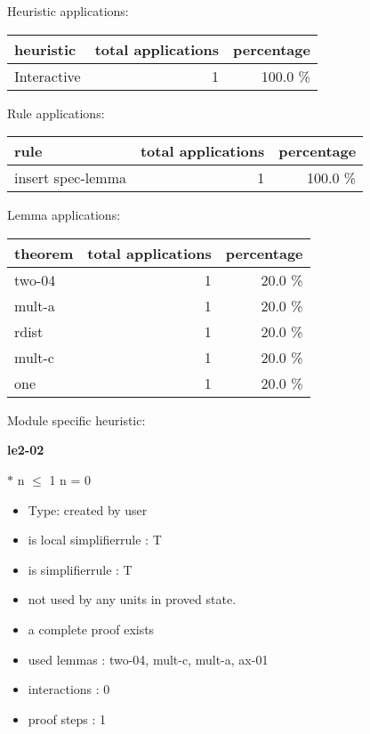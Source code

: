 \documentclass[a4paper]{article}
\begin{document}
\medskip


Heuristic applications:

\begin{supertabular}{l|r|r}
heuristic	& total applications & percentage \\ \hline
Interactive & 1 & 100.0 \% \\

\end{supertabular}

Rule applications:

\begin{supertabular}{l|r|r}
rule	        & total applications & percentage \\ \hline
insert spec-lemma & 1 & 100.0 \% \\

\end{supertabular}

Lemma applications:

\begin{supertabular}{l|r|r}
theorem	        & total applications & percentage \\ \hline
two-04 & 1 & 20.0 \% \\
mult-a & 1 & 20.0 \% \\
rdist & 1 & 20.0 \% \\
mult-c & 1 & 20.0 \% \\
one & 1 & 20.0 \% \\

\end{supertabular}

Module specific heuristic:

\pagebreak

{\LARGE\bf le2-02}\label{lemma-le2-02}

\medskip

  $*$ n $\le$ 1 \Equiv n = 0

\begin{itemize}

\item Type: created by user

\item is local simplifierrule : T
\item is simplifierrule : T
\item not used by any units in proved state.
\item       a complete proof exists
\item       used lemmas  : two-04, mult-c, mult-a, ax-01
\item       interactions : 0
\item       proof steps  : 1
\end{itemize}
\end{document}
